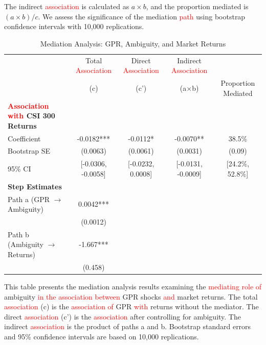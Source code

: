 \documentclass[preprint,12pt,authoryear]{elsarticle}
\begin{document}
The indirect \textcolor{red}{association} is calculated as $a \times b$, and the proportion mediated is $(a \times b) / c$. We assess the significance of the mediation \textcolor{red}{path} using bootstrap confidence intervals with 10,000 replications.

\begin{table}
\centering
\caption{Mediation Analysis: GPR, Ambiguity, and Market Returns}
\label{tab:mediation}
\begin{threeparttable}
\begin{tabular*}{\textwidth}{@{\extracolsep{\fill}} lcccc @{\extracolsep{\fill}}}
\toprule
& Total \textcolor{red}{Association} & Direct \textcolor{red}{Association} & Indirect \textcolor{red}{Association} & \\
& (c) & (c') & (a$\times$b) & Proportion Mediated \\
\midrule
\midrule
\textbf{\textcolor{red}{Association with} CSI 300 Returns} & & & & \\
Coefficient & -0.0182*** & -0.0112* & -0.0070** & 38.5\% \\
Bootstrap SE & (0.0063) & (0.0061) & (0.0031) & (0.09) \\
95\% CI & [-0.0306, -0.0058] & [-0.0232, 0.0008] & [-0.0131, -0.0009] & [24.2\%, 52.8\%] \\
\midrule
\textbf{Step Estimates} & & & & \\
Path a (GPR $\rightarrow$ Ambiguity) & 0.0042*** & & & \\
& (0.0012) & & & \\
Path b (Ambiguity $\rightarrow$ Returns) & -1.667*** & & & \\
& (0.458) & & & \\
\bottomrule
\end{tabular*}
\begin{tablenotes}[flushleft]
\small
\item[] This table presents the mediation analysis results examining the \textcolor{red}{mediating role of} ambiguity \textcolor{red}{in the association between} GPR shocks \textcolor{red}{and} market returns. The total \textcolor{red}{association} (c) is the \textcolor{red}{association of} GPR \textcolor{red}{with} returns without the mediator. The direct \textcolor{red}{association} (c') is the \textcolor{red}{association} after controlling for ambiguity. The indirect \textcolor{red}{association} is the product of paths a and b. Bootstrap standard errors and 95\% confidence intervals are based on 10,000 replications.
\end{tablenotes}
\end{threeparttable}
\end{table}
\end{document}
